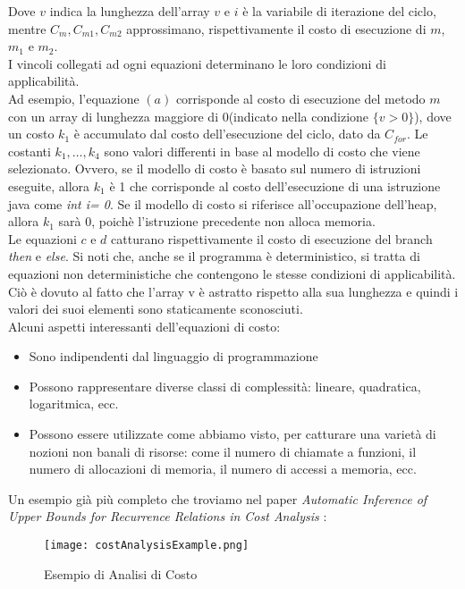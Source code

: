 \documentclass[../../main.tex]{subfiles}
\begin{document}
Dove $v$ indica la lunghezza dell'array $v$ e $i$ è la variabile di iterazione del ciclo, mentre $C_m,C_{m1},C_{m2}$ approssimano, rispettivamente il costo di esecuzione di $m$, $m_1$ e $m_2$.\\
I vincoli collegati ad ogni equazioni determinano le loro condizioni di applicabilità.\\
Ad esempio, l'equazione $(a)$ corrisponde al costo di esecuzione del metodo $m$ con un array di lunghezza maggiore di 0(indicato nella condizione $\{v > 0\}$), dove un costo $k_1$ è accumulato dal costo dell'esecuzione del ciclo, dato da $C_{for}$.
Le costanti $k_1,\dots,k_4$ sono valori differenti in base al modello di costo che viene selezionato.
Ovvero, se il modello di costo è basato sul numero di istruzioni eseguite, allora $k_1$ è 1 che corrisponde al costo dell'esecuzione di una istruzione java come \textit{int i= 0}.
Se il modello di costo si riferisce all'occupazione dell'heap, allora $k_1$ sarà 0, poichè l'istruzione precedente non alloca memoria.\\
Le equazioni $c$ e $d$ catturano rispettivamente il costo di esecuzione del branch \textit{then} e \textit{else}.
Si noti che, anche se il programma è deterministico, si tratta di equazioni non deterministiche che contengono le stesse condizioni di applicabilità. Ciò è dovuto al fatto che l'array v è astratto rispetto alla sua lunghezza e quindi i valori dei suoi elementi sono staticamente sconosciuti.\\
Alcuni aspetti interessanti dell'equazioni di costo:
\begin{itemize}
    \item Sono indipendenti dal linguaggio di programmazione
    \item Possono rappresentare diverse classi di complessità: lineare, quadratica, logaritmica, ecc.
    \item Possono essere utilizzate come abbiamo visto, per catturare una varietà di nozioni non banali di risorse: come il numero di chiamate a funzioni, il numero di allocazioni di memoria, il numero di accessi a memoria, ecc.
\end{itemize}
Un esempio già più completo che troviamo nel paper \textit{Automatic Inference of Upper Bounds for Recurrence Relations in Cost Analysis} \autocite{albert2008automatic}:
\begin{figure}[H]
    \centering
    \texttt{[image: costAnalysisExample.png]}
    \caption{Esempio di Analisi di Costo}
    \label{fig:costAnalysisExample}
\end{figure}
\end{document}
